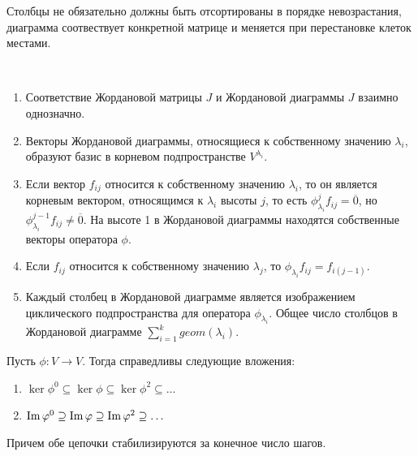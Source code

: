 \begin{note}
    Столбцы не обязательно должны быть отсортированы в порядке невозрастания, диаграмма соотвествует 
    конкретной матрице и меняется при перестановке клеток местами.
\end{note}

\begin{proposition}~
    \begin{enumerate}
        \item Соответствие Жордановой матрицы $J$ и Жордановой диаграммы $J$ взаимно однозначно.
        \item Векторы Жордановой диаграммы, относящиеся к собственному значению $\lambda_i$, образуют базис 
        в корневом подпространстве $V^{\lambda_i}$.
        \item Если вектор $f_{ij}$ относится к собственному значению $\lambda_i$, 
        то он является корневым вектором, относящимся к $\lambda_i$ высоты $j$, 
        то есть $\phi_{\lambda_i}^j f_{ij} = \overline{0}$, но $\phi_{\lambda_i}^{j-1} f_{ij} \neq \overline{0}$.
        На высоте 1 в Жордановой диаграммы находятся собственные векторы оператора $\phi$.
        \item Если $f_{ij}$ относится к собственному значению $\lambda_{j}$, то $\phi_{\lambda_i} f_{ij} = f_{i(j-1)}$.
        \item Каждый столбец в Жордановой диаграмме является изображением циклического подпространства для оператора $\phi_{\lambda_i}$. Общее число столбцов в Жордановой диаграмме $\displaystyle\sum_{i=1}^{k} geom(\lambda_i)$.
    \end{enumerate}
\end{proposition}

\begin{proposition}
    Пусть $\phi : V \to V$. Тогда справедливы следующие вложения:
    \begin{enumerate}
        \item $\ker \phi^0 \subseteq \ker \phi \subseteq \ker \phi^2 \subseteq \dots$
        \item $\operatorname{Im} \varphi^0 \supseteq \operatorname{Im} \varphi \supseteq \operatorname{Im} \varphi^2 \supseteq \dots$
    \end{enumerate}
    Причем обе цепочки стабилизируются за конечное число шагов.
\end{proposition}

